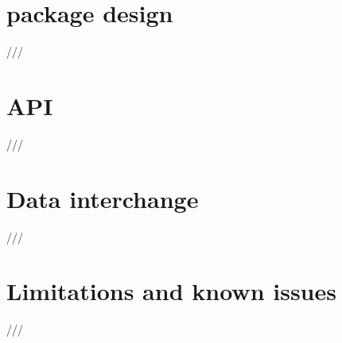 \section{ package design}

///

\section{ API}

///

\section{Data interchange}

///



\section{Limitations and known issues}

///





